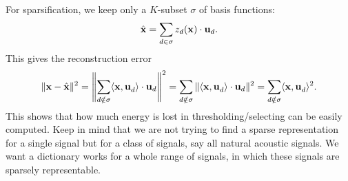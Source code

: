 \documentclass[../book-template.tex]{subfiles}
\begin{document}
For sparsification, we keep only a $K$-subset $\sigma$ of basis functions:
\begin{equation*}
	\hat{\bf x}=\sum_{d\in \sigma}z_d({\bf x})\cdot {\bf u}_d.
\end{equation*}
This gives the reconstruction error
\begin{equation*}
	\|{\bf x}-\hat{\bf x}\|^2=\left\|\sum_{d\notin \sigma}\langle {\bf x,u}_d\rangle \cdot {\bf u}_d \right\|^2 = \sum_{d\notin \sigma}\|\langle {\bf x,u}_d\rangle \cdot {\bf u}_d\|^2 = \sum_{d\notin \sigma}\langle {\bf x,u}_d\rangle^2.
\end{equation*}
This shows that how much energy is lost in thresholding/selecting can be easily computed. Keep in mind that we are not trying to find a sparse representation for a single signal but for a class of signals, say all natural acoustic signals. We want a dictionary works for a whole range of signals, in which these signals are sparsely representable. 
\end{document}
